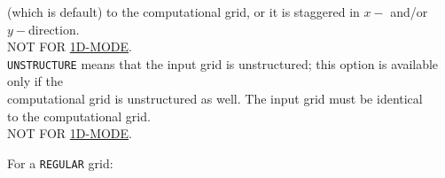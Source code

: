 \documentclass[12pt]{book}
\begin{document}
\begin{tabbing}
                       (which is default) to the computational grid, or it is staggered in $x-$ and/or\\
                       $y-$direction.\\
                       NOT FOR \underline{1D-MODE}.\-\\
{\tt UNSTRUCTURE}   \> means that the input grid is unstructured; this option is available only if the\+\\
                       computational grid is unstructured as well. The input grid must be identical\\
                       to the computational grid.\\
                       NOT FOR \underline{1D-MODE}.\-\\
\end{tabbing}
For a {\tt REGULAR} grid:
\end{document}
